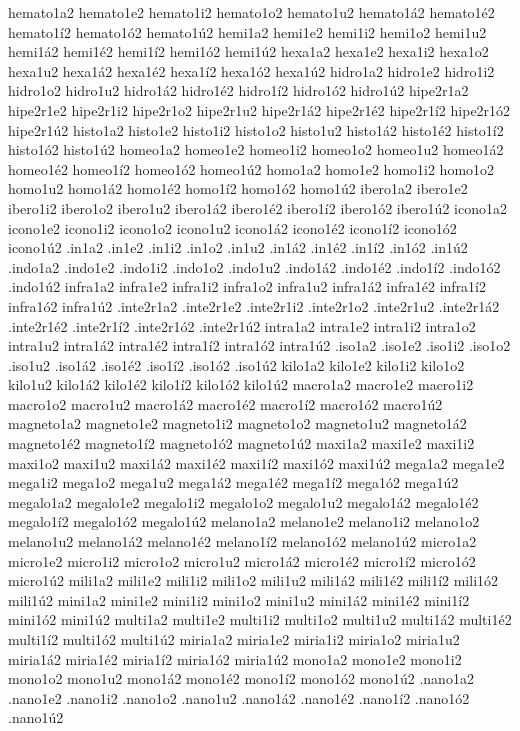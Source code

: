 {hemato1a2 hemato1e2 hemato1i2 hemato1o2 hemato1u2 hemato1á2 hemato1é2 hemato1í2 hemato1ó2 hemato1ú2
hemi1a2 hemi1e2 hemi1i2 hemi1o2 hemi1u2 hemi1á2 hemi1é2 hemi1í2 hemi1ó2 hemi1ú2
hexa1a2 hexa1e2 hexa1i2 hexa1o2 hexa1u2 hexa1á2 hexa1é2 hexa1í2 hexa1ó2 hexa1ú2
hidro1a2 hidro1e2 hidro1i2 hidro1o2 hidro1u2 hidro1á2 hidro1é2 hidro1í2 hidro1ó2 hidro1ú2
hipe2r1a2 hipe2r1e2 hipe2r1i2 hipe2r1o2 hipe2r1u2 hipe2r1á2 hipe2r1é2 hipe2r1í2 hipe2r1ó2 hipe2r1ú2
histo1a2 histo1e2 histo1i2 histo1o2 histo1u2 histo1á2 histo1é2 histo1í2 histo1ó2 histo1ú2
homeo1a2 homeo1e2 homeo1i2 homeo1o2 homeo1u2 homeo1á2 homeo1é2 homeo1í2 homeo1ó2 homeo1ú2
homo1a2 homo1e2 homo1i2 homo1o2 homo1u2 homo1á2 homo1é2 homo1í2 homo1ó2 homo1ú2
ibero1a2 ibero1e2 ibero1i2 ibero1o2 ibero1u2 ibero1á2 ibero1é2 ibero1í2 ibero1ó2 ibero1ú2
icono1a2 icono1e2 icono1i2 icono1o2 icono1u2 icono1á2 icono1é2 icono1í2 icono1ó2 icono1ú2
.in1a2 .in1e2 .in1i2 .in1o2 .in1u2 .in1á2 .in1é2 .in1í2 .in1ó2 .in1ú2
.indo1a2 .indo1e2 .indo1i2 .indo1o2 .indo1u2 .indo1á2 .indo1é2 .indo1í2 .indo1ó2 .indo1ú2
infra1a2 infra1e2 infra1i2 infra1o2 infra1u2 infra1á2 infra1é2 infra1í2 infra1ó2 infra1ú2
.inte2r1a2 .inte2r1e2 .inte2r1i2 .inte2r1o2 .inte2r1u2 .inte2r1á2 .inte2r1é2 .inte2r1í2 .inte2r1ó2 .inte2r1ú2
intra1a2 intra1e2 intra1i2 intra1o2 intra1u2 intra1á2 intra1é2 intra1í2 intra1ó2 intra1ú2
.iso1a2 .iso1e2 .iso1i2 .iso1o2 .iso1u2 .iso1á2 .iso1é2 .iso1í2 .iso1ó2 .iso1ú2
kilo1a2 kilo1e2 kilo1i2 kilo1o2 kilo1u2 kilo1á2 kilo1é2 kilo1í2 kilo1ó2 kilo1ú2
macro1a2 macro1e2 macro1i2 macro1o2 macro1u2 macro1á2 macro1é2 macro1í2 macro1ó2 macro1ú2
magneto1a2 magneto1e2 magneto1i2 magneto1o2 magneto1u2 magneto1á2 magneto1é2 magneto1í2 magneto1ó2 magneto1ú2
maxi1a2 maxi1e2 maxi1i2 maxi1o2 maxi1u2 maxi1á2 maxi1é2 maxi1í2 maxi1ó2 maxi1ú2
mega1a2 mega1e2 mega1i2 mega1o2 mega1u2 mega1á2 mega1é2 mega1í2 mega1ó2 mega1ú2
megalo1a2 megalo1e2 megalo1i2 megalo1o2 megalo1u2 megalo1á2 megalo1é2 megalo1í2 megalo1ó2 megalo1ú2
melano1a2 melano1e2 melano1i2 melano1o2 melano1u2 melano1á2 melano1é2 melano1í2 melano1ó2 melano1ú2
micro1a2 micro1e2 micro1i2 micro1o2 micro1u2 micro1á2 micro1é2 micro1í2 micro1ó2 micro1ú2
mili1a2 mili1e2 mili1i2 mili1o2 mili1u2 mili1á2 mili1é2 mili1í2 mili1ó2 mili1ú2
mini1a2 mini1e2 mini1i2 mini1o2 mini1u2 mini1á2 mini1é2 mini1í2 mini1ó2 mini1ú2
multi1a2 multi1e2 multi1i2 multi1o2 multi1u2 multi1á2 multi1é2 multi1í2 multi1ó2 multi1ú2
miria1a2 miria1e2 miria1i2 miria1o2 miria1u2 miria1á2 miria1é2 miria1í2 miria1ó2 miria1ú2
mono1a2 mono1e2 mono1i2 mono1o2 mono1u2 mono1á2 mono1é2 mono1í2 mono1ó2 mono1ú2
.nano1a2 .nano1e2 .nano1i2 .nano1o2 .nano1u2 .nano1á2 .nano1é2 .nano1í2 .nano1ó2 .nano1ú2
}
